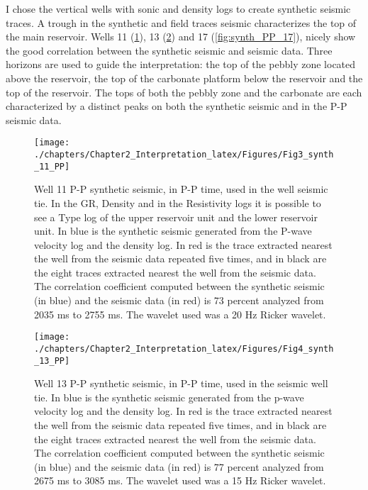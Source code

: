 I chose the vertical wells with sonic and density logs to create synthetic seismic traces. A trough in the synthetic and field traces seismic characterizes the top of the main reservoir. Wells 11 (\ref{fig:synth_PP_11}), 13 (\ref{fig:synth_PP_13}) and 17 (\ref{fig:synth_PP_17}), nicely show the good correlation between the synthetic seismic and seismic data.  Three horizons are used to guide the interpretation: the top of the pebbly zone located above the reservoir, the top of the carbonate platform below the reservoir and the top of the reservoir. The tops of both the pebbly zone and the carbonate are each characterized by a distinct peaks on both the synthetic seismic and in the P-P seismic data. 

\begin{figure}[hbtp]
	\begin{center}
	\texttt{[image: ./chapters/Chapter2\_Interpretation\_latex/Figures/Fig3\_synth\_11\_PP]}
			\caption[Well 11 P-P synthetic seismic.]{Well 11 P-P synthetic seismic, in P-P time, used in the well seismic tie. In the GR, Density and in the Resistivity logs it is possible to see a Type log of the upper reservoir unit and the lower reservoir unit. In blue is the synthetic seismic generated from the P-wave velocity log and the density log. In red is the trace extracted nearest the well from the seismic data repeated five times, and in black are the eight traces extracted nearest the well from the seismic data. The correlation coefficient computed between the synthetic seismic (in blue) and the seismic data (in red) is 73 percent analyzed from 2035 ms to 2755 ms. The wavelet used was a 20 Hz Ricker wavelet.}
			\label{fig:synth_PP_11}
		\end{center}
	\end{figure}
	
\begin{figure}[hbtp]
	\begin{center}
	\texttt{[image: ./chapters/Chapter2\_Interpretation\_latex/Figures/Fig4\_synth\_13\_PP]}
			\caption[Well 13 P-P synthetic seismic.]{Well 13 P-P synthetic seismic, in P-P time, used in the seismic well tie. In blue is the synthetic seismic generated from the p-wave velocity log and the density log. In red is the trace extracted nearest the well from the seismic data repeated five times, and in black are the eight traces extracted nearest the well from the seismic data. The correlation coefficient computed between the synthetic seismic (in blue) and the seismic data (in red) is 77 percent analyzed from 2675 ms to 3085 ms. The wavelet used was a 15 Hz Ricker wavelet.}
			\label{fig:synth_PP_13}
		\end{center}
	\end{figure}
		

